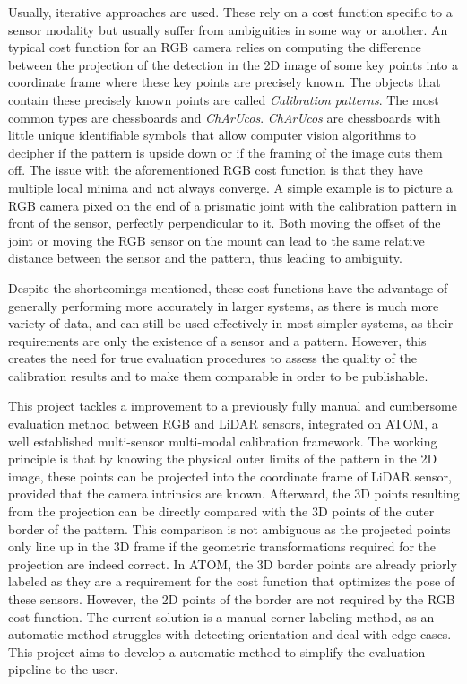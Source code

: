 \documentclass{ieeeaccess}
\begin{document}
Usually, iterative approaches are used. These rely on a cost function specific to a sensor modality but usually suffer from ambiguities
in some way or another. An typical cost function for an RGB camera relies on computing the difference between the projection of the
detection in the 2D image of some key points into a coordinate frame where these key points are precisely known. The objects that
contain these precisely known points are called \textit{Calibration patterns}. The most common types are chessboards and \textit{ChArUcos}.
\textit{ChArUcos} are chessboards with little unique identifiable symbols that allow computer vision algorithms to decipher if the
pattern is upside down or if the framing of the image cuts them off. The issue with the aforementioned RGB cost function is that they
have multiple local minima and not always converge. A simple example is to picture a RGB camera pixed on the end of a prismatic joint
with the calibration pattern in front of the sensor, perfectly perpendicular to it. Both moving the offset of the joint or
moving the RGB sensor on the mount can lead to the same relative distance between the sensor and the pattern, thus leading to
ambiguity. 

Despite the shortcomings mentioned, these cost functions have the advantage of generally performing more accurately in larger systems,
as there is much more variety of data, and can still be used effectively in most simpler systems, as their requirements are only the
existence of a sensor and a pattern. However, this creates the need for true evaluation procedures to assess the quality of the
calibration results and to make them comparable in order to be publishable. 

This project tackles a improvement to a previously fully manual and cumbersome evaluation method between RGB and LiDAR sensors,
integrated on ATOM, a well established multi-sensor multi-modal calibration framework. The working principle is that by knowing the
physical outer limits of the pattern in the 2D image, these points can be projected into the coordinate frame of LiDAR sensor, provided
that the camera intrinsics are known. Afterward, the 3D points resulting from the projection can be directly compared with the 3D
points of the outer border of the pattern. This comparison is not ambiguous as the projected points only line up in the 3D frame if the
geometric transformations required for the projection are indeed correct. In ATOM, the 3D border points are already priorly labeled as
they are a requirement for the cost function that optimizes the pose of these sensors. However, the 2D points of the border are not
required by the RGB cost function. The current solution is a manual corner labeling method, as an automatic method struggles
with detecting orientation and deal with edge cases. This project aims to develop a automatic method to simplify the evaluation
pipeline to the user.
\end{document}
